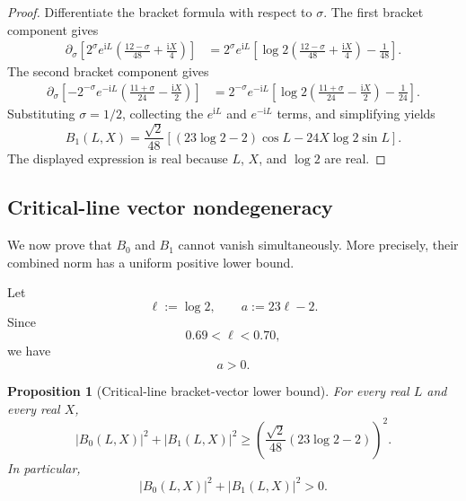 \documentclass[11pt]{article}
\newtheorem{proposition}[theorem]{Proposition}
\newcommand{\ii}{\mathrm{i}}
\begin{document}
\begin{proof}
Differentiate the bracket formula with respect to \(\sigma\).  The first
bracket component gives
\[
\begin{aligned}
        \partial_\sigma
        \left[
        2^\sigma e^{\ii L}
        \left(
        \frac{12-\sigma}{48}
        +
        \frac{\ii X}{4}
        \right)
        \right]
        &=
        2^\sigma e^{\ii L}
        \left[
        \log2
        \left(
        \frac{12-\sigma}{48}
        +
        \frac{\ii X}{4}
        \right)
        -
        \frac1{48}
        \right].
\end{aligned}
\]
The second bracket component gives
\[
\begin{aligned}
        \partial_\sigma
        \left[
        -
        2^{-\sigma}e^{-\ii L}
        \left(
        \frac{11+\sigma}{24}
        -
        \frac{\ii X}{2}
        \right)
        \right]
        &=
        2^{-\sigma}e^{-\ii L}
        \left[
        \log2
        \left(
        \frac{11+\sigma}{24}
        -
        \frac{\ii X}{2}
        \right)
        -
        \frac1{24}
        \right].
\end{aligned}
\]
Substituting \(\sigma=1/2\), collecting the \(e^{\ii L}\) and \(e^{-\ii L}\)
terms, and simplifying yields
\[
        B_1(L,X)
        =
        \frac{\sqrt2}{48}
        \left[
        (23\log2-2)\cos L
        -
        24X\log2\sin L
        \right].
\]
The displayed expression is real because \(L\), \(X\), and \(\log2\) are real.
\end{proof}

\subsection{Critical-line vector nondegeneracy}

We now prove that \(B_0\) and \(B_1\) cannot vanish simultaneously.  More
precisely, their combined norm has a uniform positive lower bound.

Let
\[
        \ell:=\log2,
        \qquad
        a:=23\ell-2.
\]
Since
\[
        0.69<\ell<0.70,
\]
we have
\[
        a>0.
\]

\begin{proposition}[Critical-line bracket-vector lower bound]
\label{prop:critical-vector-lower-bound}
For every real \(L\) and every real \(X\),
\[
        |B_0(L,X)|^2+|B_1(L,X)|^2
        \ge
        \left(
        \frac{\sqrt2}{48}(23\log2-2)
        \right)^2.
\]
In particular,
\[
        |B_0(L,X)|^2+|B_1(L,X)|^2>0.
\]
\end{proposition}
\end{document}
